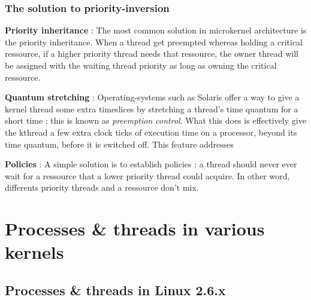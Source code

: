 
\begin{frame}
\frametitle{The solution to priority-inversion}

\textbf{Priority inheritance} : The most common solution in microkernel architecture is the priority inheritance. When a thread get preempted whereas holding a critical ressource, if a higher priority thread needs that ressource, the owner thread will be assigned with the waiting thread priority as long as owning the critical ressource.

\-

\textbf{Quantum stretching} : Operating-systems such as Solaris offer a way to give a kernel thread some extra timeslices by stretching a thread's time quantum for a short time : this is known as \textit{preemption control}. What this does is effectively give the kthread a few extra clock ticks of execution time on a processor, beyond its time quantum, before it is switched off. This feature addresses 

\-

\textbf{Policies} : A simple solution is to establish policies : a thread should never ever wait for a ressource that a lower priority thread could acquire. In other word, differents priority threads and a ressource don't mix.

\end{frame}

\section{Processes \& threads in various kernels}

\subsection{Processes \& threads in Linux 2.6.x}


